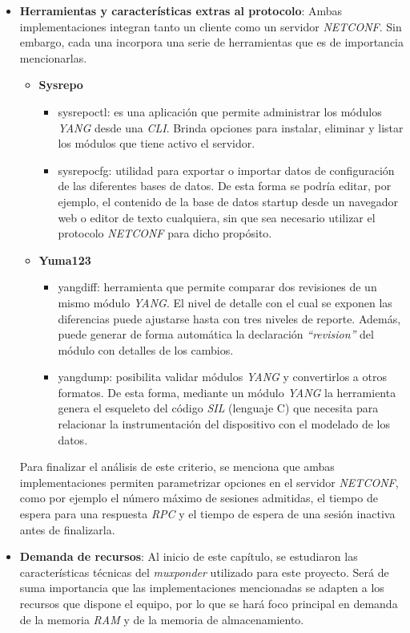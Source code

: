 \begin{itemize}
	\item \textbf{Herramientas y características extras al protocolo}: Ambas implementaciones integran tanto un cliente como un servidor \textit{NETCONF}. Sin embargo, cada una incorpora una serie de herramientas que es de importancia mencionarlas. 
	\begin{itemize}
		\item \textbf{Sysrepo}
		\begin{itemize}
			\item sysrepoctl: es una aplicación que permite administrar los módulos \textit{YANG} desde una \textit{CLI}. Brinda opciones para instalar, eliminar y listar los módulos que tiene activo el servidor.
			\item sysrepocfg: utilidad para exportar o importar datos de configuración de las diferentes bases de datos. De esta forma se podría editar, por ejemplo, el contenido de la base de datos startup desde un navegador web o editor de texto cualquiera, sin que sea necesario utilizar el protocolo \textit{NETCONF} para dicho propósito.
		\end{itemize}
		\item \textbf{Yuma123}
		\begin{itemize}
			\item yangdiff: herramienta que permite comparar dos revisiones de un mismo módulo \textit{YANG}. El nivel de detalle con el cual se exponen las diferencias puede ajustarse hasta con tres niveles de reporte. Además, puede generar de forma automática la declaración \textit{“revision”} del módulo con detalles de los cambios.
			\item yangdump: posibilita validar módulos \textit{YANG} y convertirlos a otros formatos. De esta forma, mediante un módulo \textit{YANG} la herramienta genera el esqueleto del código \textit{SIL} (lenguaje C) que necesita para relacionar la instrumentación del dispositivo con el modelado de los datos.
		\end{itemize}
	\end{itemize}

	Para finalizar el análisis de este criterio, se menciona que ambas implementaciones permiten parametrizar opciones en el servidor \textit{NETCONF}, como por ejemplo el número máximo de sesiones admitidas, el tiempo de espera para una respuesta \textit{RPC} y el tiempo de espera de una sesión inactiva antes de finalizarla.

	\item \textbf{Demanda de recursos}: Al inicio de este capítulo, se estudiaron las características técnicas del \textit{muxponder} utilizado para este proyecto. Será de suma importancia que las implementaciones mencionadas se adapten a los recursos que dispone el equipo, por lo que se hará foco principal en demanda de la memoria \textit{RAM} y de la memoria de almacenamiento. 
	

\end{itemize}
